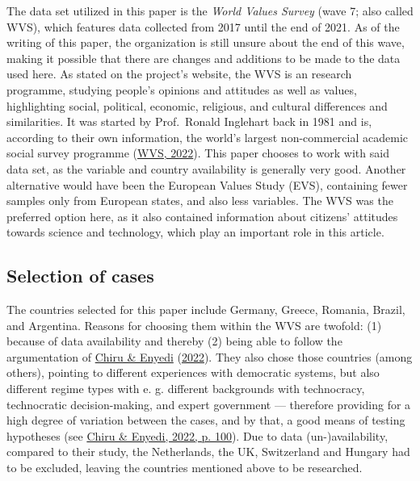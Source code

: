 \documentclass[
  12pt,
  english,
]{article}
\begin{document}
The data set utilized in this paper is the \emph{World Values Survey}
(wave 7; also called WVS), which features data collected from 2017 until
the end of 2021. As of the writing of this paper, the organization is
still unsure about the end of this wave, making it possible that there
are changes and additions to be made to the data used here. As stated on
the project's website, the WVS is an research programme, studying
people's opinions and attitudes as well as values, highlighting social,
political, economic, religious, and cultural differences and
similarities. It was started by Prof.~Ronald Inglehart back in 1981 and
is, according to their own information, the world's largest
non-commercial academic social survey programme
(\protect\hyperlink{ref-wvs2022info}{WVS, 2022}). This paper chooses to
work with said data set, as the variable and country availability is
generally very good. Another alternative would have been the European
Values Study (EVS), containing fewer samples only from European states,
and also less variables. The WVS was the preferred option here, as it
also contained information about citizens' attitudes towards science and
technology, which play an important role in this article.

\hypertarget{selection-of-cases}{%
\subsection{Selection of cases}\label{selection-of-cases}}

The countries selected for this paper include Germany, Greece, Romania,
Brazil, and Argentina. Reasons for choosing them within the WVS are
twofold: (1) because of data availability and thereby (2) being able to
follow the argumentation of \protect\hyperlink{ref-chiru2022wants}{Chiru
\& Enyedi} (\protect\hyperlink{ref-chiru2022wants}{2022}). They also
chose those countries (among others), pointing to different experiences
with democratic systems, but also different regime types with e. g.
different backgrounds with technocracy, technocratic decision-making,
and expert government --- therefore providing for a high degree of
variation between the cases, and by that, a good means of testing
hypotheses (see \protect\hyperlink{ref-chiru2022wants}{Chiru \& Enyedi,
2022, p. 100}). Due to data (un-)availability, compared to their study,
the Netherlands, the UK, Switzerland and Hungary had to be excluded,
leaving the countries mentioned above to be researched.
\end{document}
